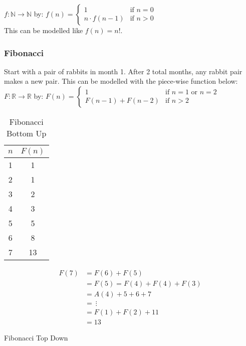 \documentclass{article}
\newcommand{\N}{\ensuremath{\mathbb{N}}}
\newcommand{\R}{\ensuremath{\mathbb{R}}}
\begin{document}
        $f\colon \N \rightarrow \N$ by:
        $f(n) =$$
        \begin{cases} 
            1 & \text{if } n = 0 \\
            n \cdot f(n-1) & \text{if } n > 0
        \end{cases} $ \\

        This can be modelled like $f(n) = n!$.

        \vspace{0.3cm}

        \subsubsection{Fibonacci}

            Start with a pair of rabbits in month 1. After 2 total months, any rabbit pair makes a new pair. This can be modelled with the piece-wise function below: \\

            $F\colon \R \rightarrow \R$ by: 
            $F(n) =
            \begin{cases} 
                1 & \text{if } n = 1 \text{ or } n = 2 \\
                F(n-1) + F(n-2) & \text{if } n > 2
            \end{cases} $ \\
            
            \begin{table}[h]
                \centering
                \begin{tabular}{c|c}
                    $n$ & $F(n)$ \\
                    \hline
                    1 & 1 \\
                    2 & 1 \\
                    3 & 2 \\
                    4 & 3 \\
                    5 & 5 \\
                    6 & 8 \\
                    7 & 13
                \end{tabular}
                \caption{Fibonacci Bottom Up}
                \label{Bottom Up}
            \end{table}

            \begin{table}[h]
                \centering
                \begin{align*}
                    F(7) &= F(6) + F(5) \\
                    &= F(5) = F(4) + F(4) + F(3)\\
                    &= A(4) + 5 + 6 + 7 \\
                    &= \ \vdots \\
                    &= F(1) + F(2) + 11 \\
                    & = 13
                \end{align*}
                \caption{Fibonacci Top Down}
                \label{Top Down Fibonacci}
            \end{table}
\end{document}
